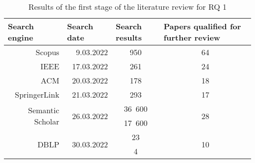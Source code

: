 \begin{table}[]
    \begin{threeparttable}[b]
        \centering
        \caption{Results of the first stage of the literature review for RQ 1}
        \begin{tabular}{@{}rrcc@{}}
            \toprule
            \multicolumn{1}{l}{\textbf{Search engine}}          & \multicolumn{1}{l}{\textbf{Search date}} & \multicolumn{1}{l}{\textbf{Search results}} & \multicolumn{1}{l}{\textbf{Papers qualified for further review}} \\
            \midrule
            Scopus                                              & 9.03.2022                                & 950                                         & 64                                                               \\
            IEEE                                                & 17.03.2022                               & 261                                         & 24                                                               \\
            ACM                                                 & 20.03.2022                               & 178                                         & 18                                                               \\
            SpringerLink                                        & 21.03.2022                               & 293                                         & 17                                                               \\
            \multirow{2}{*}{Semantic Scholar\tnote{1}}          & \multirow{2}{*}{26.03.2022}              & 36\ 600\tnote{2}                       & \multirow{2}{*}{28}                                              \\
                                                                &                                          & 17\ 600\tnote{3}                       &                                                                  \\
            \multirow{2}{*}{DBLP}                               & \multirow{2}{*}{30.03.2022}              & 23\tnote{2}                                 & \multirow{2}{*}{10}                                              \\
                                                                &                                          & 4\tnote{3}                                  &                                                                  \\

\end{tabular}
\end{threeparttable}
\end{table}
